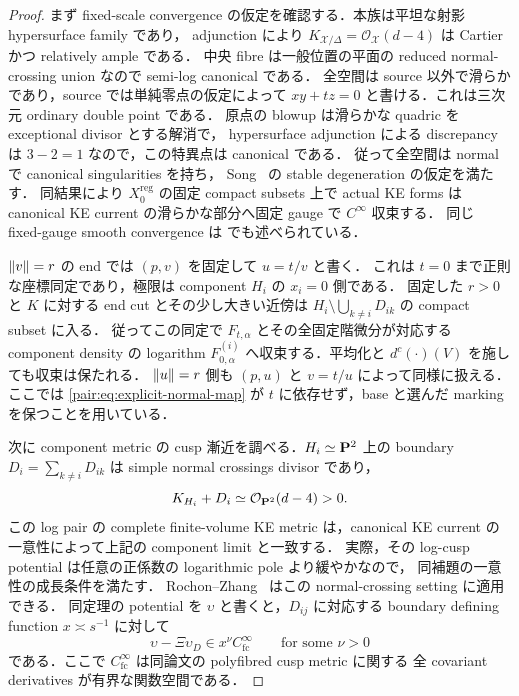 \begin{proof}
まず fixed-scale convergence の仮定を確認する．本族は平坦な射影 hypersurface family であり，
adjunction により $K_{\mathcal X/\Delta}=\mathcal O_{\mathcal X}(d-4)$ は Cartier かつ relatively ample である．
中央 fibre は一般位置の平面の reduced normal-crossing union なので semi-log canonical である．
全空間は source 以外で滑らかであり，source では単純零点の仮定によって
$xy+tz=0$ と書ける．これは三次元 ordinary double point である．
原点の blowup は滑らかな quadric を exceptional divisor とする解消で，
hypersurface adjunction による discrepancy は $3-2=1$ なので，この特異点は canonical である．
従って全空間は normal で canonical singularities を持ち，
Song~\cite[Definition~2.3, Lemmas~4.4--4.5]{SongDegeneration} の stable degeneration の仮定を満たす．
同結果により $X_0^{\mathrm{reg}}$ の固定 compact subsets 上で actual KE forms は
canonical KE current の滑らかな部分へ固定 gauge で $C^\infty$ 収束する．
同じ fixed-gauge smooth convergence は
\cite[Lemma~6.1 の証明]{SongSturmWang} でも述べられている．

$\left\lVert v\right\rVert=r$ の end では $(p,v)$ を固定して $u=t/v$ と書く．
これは $t=0$ まで正則な座標同定であり，極限は component $H_i$ の $x_i=0$ 側である．
固定した $r>0$ と $K$ に対する end cut とその少し大きい近傍は
$H_i\setminus\bigcup_{k\ne i}D_{ik}$ の compact subset に入る．
従ってこの同定で $F_{t,\alpha}$ とその全固定階微分が対応する component density の
logarithm $F_{0,\alpha}^{(i)}$ へ収束する．平均化と $d^c(\cdot)(V)$ を施しても収束は保たれる．
$\left\lVert u\right\rVert=r$ 側も $(p,u)$ と $v=t/u$ によって同様に扱える．
ここでは \eqref{pair:eq:explicit-normal-map} が $t$ に依存せず，base と選んだ marking を保つことを用いている．

次に component metric の cusp 漸近を調べる．$H_i\simeq\mathbf P^2$ 上の boundary
$D_i=\sum_{k\ne i}D_{ik}$ は simple normal crossings divisor であり，
\[
 K_{H_i}+D_i\simeq\mathcal O_{\mathbf P^2}(d-4)>0.
\]
この log pair の complete finite-volume KE metric は，canonical KE current の
一意性\cite[Lemma~3.7]{SongDegeneration}によって上記の component limit と一致する．
実際，その log-cusp potential は任意の正係数の logarithmic pole より緩やかなので，
同補題の一意性の成長条件を満たす．
Rochon--Zhang~\cite[\S5, 特に式~(5.5)--(5.6) と Theorem~5.1]{RochonZhang}
はこの normal-crossing setting に適用できる．
同定理の potential を $\upsilon$ と書くと，$D_{ij}$ に対応する boundary defining function
$x\asymp s^{-1}$ に対して
\begin{equation}\label{pair:eq:rz-potential-remainder}
 \upsilon-\Xi\upsilon_D\in x^\nu C^\infty_{\mathrm{fc}}
 \qquad\text{for some }\nu>0
\end{equation}
である．ここで $C^\infty_{\mathrm{fc}}$ は同論文の polyfibred cusp metric に関する
全 covariant derivatives が有界な関数空間である．


\end{proof}
